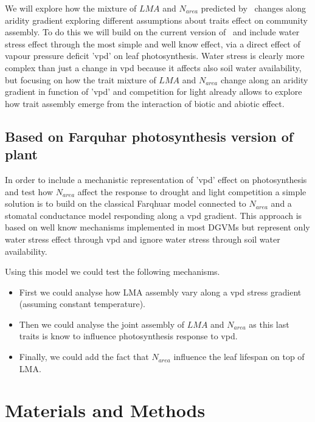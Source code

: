 \documentclass[a4paper,11pt]{article}
\begin{document}
We will explore how the mixture of $LMA$ and $N_{area}$ predicted by \plant\ changes along aridity gradient exploring different assumptions about traits effect on community assembly. To do this we will build on the current version of \plant\ and include water stress effect through the most simple and well know effect, via a direct effect of vapour pressure deficit 'vpd' on leaf photosynthesis. Water stress is clearly more complex than just a change in vpd because it affects also soil water availability, but focusing on how the trait mixture of $LMA$ and $N_{area}$ change along an aridity gradient in function of 'vpd' and competition for light already allows to explore how trait assembly emerge from the interaction of biotic and abiotic effect.

\subsection{Based on Farquhar photosynthesis version of plant}

In order to include a mechanistic representation of 'vpd' effect on photosynthesis and test how $N_{area}$ affect the response to drought and light competition a simple solution is to build on the classical Farqhuar model connected to $N_{area}$ and a stomatal
  conductance model responding along a vpd gradient. This approach
  is based on well know mechanisms implemented in most DGVMs but
  represent only water stress effect through vpd and ignore water stress through soil water availability.

Using this model we could test the following mechanisms.

\begin{itemize}

\item First we could analyse how LMA assembly vary along a vpd stress gradient (assuming constant temperature).

\item Then we could analyse the joint assembly of $LMA$ and $N_{area}$ as this last traits is know to influence photosynthesis response to vpd.

\item Finally, we could add the fact that $N_{area}$ influence the leaf lifespan on top of LMA.

\end{itemize}


\section{Materials and Methods}
\end{document}
